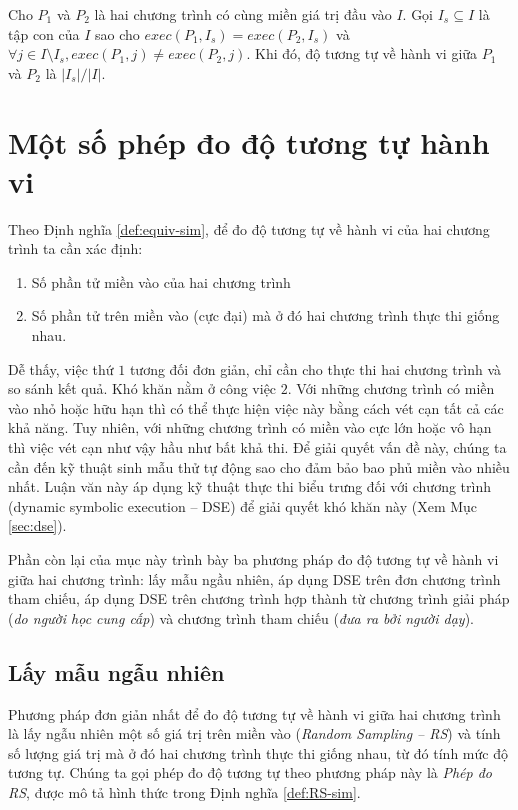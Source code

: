 \begin{definition}
  \label{def:equiv-sim}
  Cho $P_{1}$ và $P_{2}$ là hai chương trình có cùng miền giá trị đầu
  vào $I$. Gọi $I_{s} \subseteq I$ là tập con của $I$ sao cho
  $exec(P_{1}, I_{s}) = exec(P_{2}, I_{s})$ và
  $\forall j \in I \setminus I_{s}, exec(P_{1}, j) \neq exec(P_{2},
  j)$. Khi đó, độ tương tự về hành vi giữa $P_1$ và $P_2$ là $|I_s|/|I|$.
\end{definition}

\section{Một số phép đo độ tương tự hành vi}
\label{sec:metrics}

Theo Định nghĩa \ref{def:equiv-sim}, để đo độ tương tự về hành vi của
hai chương trình ta cần xác định:
\begin{enumerate}
\item Số phần tử miền vào của hai chương trình
\item Số phần tử trên miền vào (cực đại) mà ở đó hai chương trình thực thi giống nhau.
\end{enumerate}
Dễ thấy, việc thứ $1$ tương đối đơn giản, chỉ cần cho thực thi hai
chương trình và so sánh kết quả. Khó khăn nằm ở công việc $2$. Với
những chương trình có miền vào nhỏ hoặc hữu hạn thì có thể thực hiện
việc này bằng cách vét cạn tất cả các khả năng. Tuy nhiên, với những
chương trình có miền vào cực lớn hoặc vô hạn thì việc vét cạn như vậy
hầu như bất khả thi. Để giải quyết vấn đề này, chúng ta cần đến kỹ
thuật sinh mẫu thử tự động sao cho đảm bảo bao phủ miền vào nhiều
nhất. Luận văn này áp dụng kỹ thuật thực thi biểu trưng đối với chương
trình (dynamic symbolic execution -- DSE) để giải quyết khó khăn này
(Xem Mục \ref{sec:dse}).

Phần còn lại của mục này trình bày ba phương pháp đo độ tương tự về
hành vi giữa hai chương trình: lấy mẫu ngầu nhiên, áp dụng DSE trên
đơn chương trình tham chiếu, áp dụng DSE trên chương trình hợp thành
từ chương trình giải pháp (\emph{do người học cung cấp}) và chương
trình tham chiếu (\emph{đưa ra bởi người dạy}).

\subsection{Lấy mẫu ngẫu nhiên}

Phương pháp đơn giản nhất để đo độ tương tự về hành vi giữa hai chương
trình là lấy ngẫu nhiên một số giá trị trên miền vào (\emph{Random
  Sampling -- RS}) và tính số lượng giá trị mà ở đó hai chương trình
thực thi giống nhau, từ đó tính mức độ tương tự. Chúng ta gọi phép đo
độ tương tự theo phương pháp này là \emph{Phép đo RS}, được mô tả hình thức
trong Định nghĩa \ref{def:RS-sim}.


